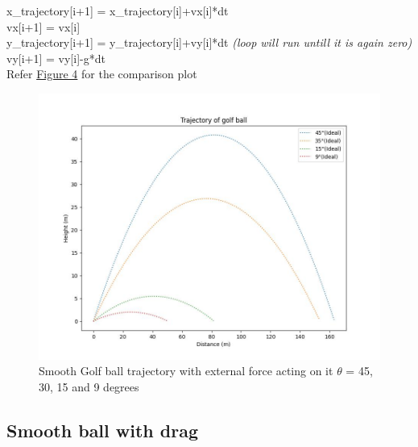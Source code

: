 \documentclass[11pt]{article}
\begin{document}
\begin{raggedright}
\begin{justify}
x\_trajectory[i+1] = x\_trajectory[i]+vx[i]*dt\\
vx[i+1] = vx[i]\\
y\_trajectory[i+1] = y\_trajectory[i]+vy[i]*dt \textit{(loop will run untill it is again zero)}\\
vy[i+1] = vy[i]-g*dt\\
Refer \hyperref[fig:ideal_trajectory]{Figure 4} for the comparison plot

\end{justify}
\end{raggedright}

\begin{figure}[b]
    \centering
    \includegraphics[width=\textwidth, height=\textheight, keepaspectratio]{Golf_Trajectory_Ideal.jpeg}
    \caption{Smooth Golf ball trajectory with external force acting on it $\theta$ = 45, 30, 15 and 9 degrees}
    \label{fig:ideal_trajectory}
\end{figure}

\subsection{Smooth ball with drag}
\end{document}
